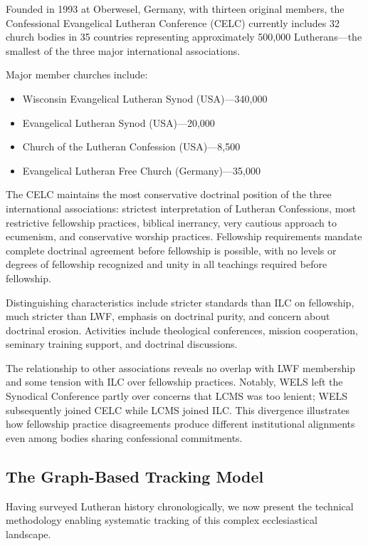 Founded in 1993 at Oberwesel, Germany, with thirteen original members, the Confessional Evangelical Lutheran Conference (CELC) currently includes 32 church bodies in 35 countries representing approximately 500,000 Lutherans---the smallest of the three major international associations.

Major member churches include:

\begin{itemize}
\item Wisconsin Evangelical Lutheran Synod (USA)---340,000
\item Evangelical Lutheran Synod (USA)---20,000
\item Church of the Lutheran Confession (USA)---8,500
\item Evangelical Lutheran Free Church (Germany)---35,000
\end{itemize}

The CELC maintains the most conservative doctrinal position of the three international associations: strictest interpretation of Lutheran Confessions, most restrictive fellowship practices, biblical inerrancy, very cautious approach to ecumenism, and conservative worship practices. Fellowship requirements mandate complete doctrinal agreement before fellowship is possible, with no levels or degrees of fellowship recognized and unity in all teachings required before fellowship.

Distinguishing characteristics include stricter standards than ILC on fellowship, much stricter than LWF, emphasis on doctrinal purity, and concern about doctrinal erosion. Activities include theological conferences, mission cooperation, seminary training support, and doctrinal discussions.

The relationship to other associations reveals no overlap with LWF membership and some tension with ILC over fellowship practices. Notably, WELS left the Synodical Conference partly over concerns that LCMS was too lenient; WELS subsequently joined CELC while LCMS joined ILC. This divergence illustrates how fellowship practice disagreements produce different institutional alignments even among bodies sharing confessional commitments.

\subsection{The Graph-Based Tracking Model}

Having surveyed Lutheran history chronologically, we now present the technical methodology enabling systematic tracking of this complex ecclesiastical landscape.

